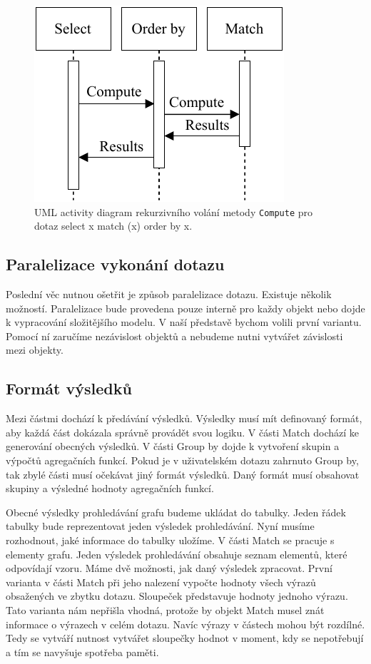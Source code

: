 \begin{figure}[!htp]
\includegraphics{../img/diaQueryObjectsCall.pdf}\centering
\caption{UML activity diagram rekurzivního volání metody \texttt{Compute} pro dotaz select x match (x) order by x.}
\label{figure.diaQueryObjectsCall}
\end{figure}

\subsection{Paralelizace vykonání dotazu}

Poslední věc nutnou ošetřit je způsob paralelizace dotazu.
Existuje několik možností.
Paralelizace bude provedena pouze interně pro každy objekt nebo dojde k vypracování složitějšího modelu.
V naší představě bychom volili první variantu.
Pomocí ní zaručíme nezávislost objektů a nebudeme nutni vytvářet závislosti mezi objekty.

\subsection{Formát výsledků} \label{anal.tables}

Mezi částmi dochází k předávání výsledků.
Výsledky musí mít definovaný formát, aby každá část dokázala správně provádět svou logiku.
V části Match dochází ke generování obecných výsledků.
V části Group by dojde k vytvoření skupin a výpočtů agregačních funkcí.
Pokud je v uživatelském dotazu zahrnuto Group by, tak zbylé části musí očekávat jiný formát výsledků.
Daný formát musí obsahovat skupiny a výsledné hodnoty agregačních funkcí.

Obecné výsledky prohledávání grafu budeme ukládat do tabulky.
Jeden řádek tabulky bude reprezentovat jeden výsledek prohledávání.
Nyní musíme rozhodnout, jaké informace do tabulky uložíme.
V části Match se pracuje s elementy grafu.
Jeden výsledek prohledávání obsahuje seznam elementů, které odpovídají vzoru.
Máme dvě možnosti, jak daný výsledek zpracovat.
První varianta v části Match při jeho nalezení vypočte hodnoty všech výrazů obsažených ve zbytku dotazu.
Sloupeček představuje hodnoty jednoho výrazu.
Tato varianta nám nepřišla vhodná, protože by objekt Match musel znát informace o výrazech v celém dotazu.
Navíc výrazy v částech mohou být rozdílné.
Tedy se vytváří nutnost vytvářet sloupečky hodnot v moment, kdy se nepotřebují a tím se navyšuje spotřeba paměti.

